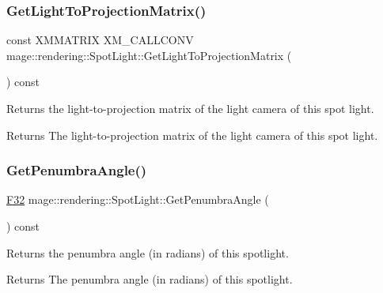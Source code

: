 \subsubsection{\texorpdfstring{Get\+Light\+To\+Projection\+Matrix()}{GetLightToProjectionMatrix()}}
{\footnotesize\ttfamily const X\+M\+M\+A\+T\+R\+IX X\+M\+\_\+\+C\+A\+L\+L\+C\+O\+NV mage\+::rendering\+::\+Spot\+Light\+::\+Get\+Light\+To\+Projection\+Matrix (\begin{DoxyParamCaption}{ }\end{DoxyParamCaption}) const\hspace{0.3cm}{\ttfamily [noexcept]}}

Returns the light-\/to-\/projection matrix of the light camera of this spot light.

\begin{DoxyReturn}{Returns}
The light-\/to-\/projection matrix of the light camera of this spot light. 
\end{DoxyReturn}
\hypertarget{classmage_1_1rendering_1_1_spot_light_a17d63e6f944d83eaca821476de70d5bc}{}\label{classmage_1_1rendering_1_1_spot_light_a17d63e6f944d83eaca821476de70d5bc} 
\subsubsection{\texorpdfstring{Get\+Penumbra\+Angle()}{GetPenumbraAngle()}}
{\footnotesize\ttfamily \hyperlink{namespacemage_aa97e833b45f06d60a0a9c4fc22ae02c0}{F32} mage\+::rendering\+::\+Spot\+Light\+::\+Get\+Penumbra\+Angle (\begin{DoxyParamCaption}{ }\end{DoxyParamCaption}) const\hspace{0.3cm}{\ttfamily [noexcept]}}

Returns the penumbra angle (in radians) of this spotlight.

\begin{DoxyReturn}{Returns}
The penumbra angle (in radians) of this spotlight. 
\end{DoxyReturn}
\hypertarget{classmage_1_1rendering_1_1_spot_light_a835e4624ec959374b099dd07c7398929}{}\label{classmage_1_1rendering_1_1_spot_light_a835e4624ec959374b099dd07c7398929} 
